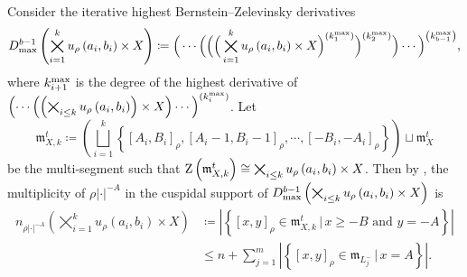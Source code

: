 \documentclass[11pt,letterpaper]{amsart}
\theoremstyle{plain}
\numberwithin{theorem}{section}
\numberwithin{equation}{subsection}
\theoremstyle{remark}
\begin{document}
Consider the iterative highest Bernstein--Zelevinsky derivatives
\[
    D_{\rm max}^{b-1}\left(\bigtimes_{i=1}^k u_\rho\left(a_i,b_i\right)\times X\right)\coloneqq\Big(\cdots\Big(\Big(\Big(\bigtimes_{i=1}^k u_\rho\left(a_i,b_i\right)\times X\Big)^{\left(k_1^{\rm max}\right)}\Big)^{\left(k_2^{\rm max}\right)}\Big)\cdots\Big)^{\left(k_{b-1}^{\rm max}\right)},
\]
where $k_{i+1}^{\rm max}$ is the degree of the highest derivative of $\left(\cdots\left(\left(\bigtimes_{i\leq k}u_\rho\left(a_i,b_i\right)\right)\times X\right)\cdots\right)^{\left(k_i^{\rm max}\right)}$. Let
\[
    \mathfrak{m}_{X,k}^t\coloneqq \left(\bigsqcup_{i=1}^k \left\{\left[A_i,B_i\right]_\rho,\left[A_i-1,B_i-1\right]_\rho,\cdots,\left[-B_i,-A_i\right]_\rho\right\}\right) \sqcup \mathfrak{m}_X^t
\]
be the multi-segment such that ${\rm Z}\left(\mathfrak{m}_{X,k}^t\right)\cong \bigtimes_{i\leq k} u_\rho\left(a_i,b_i\right)\times X$.
Then by \cite[Thm. 8.1]{ZeleII}, the multiplicity of $\rho|\cdot|^{-A}$ in the cuspidal support of $D_{\rm max}^{b-1}\left(\bigtimes_{i\leq k} u_\rho\left(a_i,b_i\right)\times X\right)$ is
\begin{align*}
n_{\rho|\cdot|^{-A}}\left(\bigtimes_{i=1}^k u_\rho\left(a_i,b_i\right)\times X\right) &\coloneqq \left|\left\{\left[x,y\right]_\rho\in\mathfrak{m}_{X,k}^t\,\big|\,x\geq -B \text{ and } y=-A\right\}\right| \\
&\leq  n + \sum_{j=1}^m\left|\left\{\left[x,y\right]_\rho\in\mathfrak{m}_{L^-_j}\,\big|\,x=A\right\}\right|.
\end{align*}

\vskip 5pt
\end{document}
